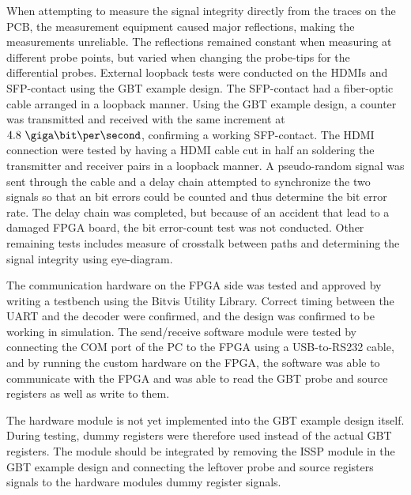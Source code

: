 \documentclass[main.tex]{subfiles}
\begin{document}
When attempting to measure the signal integrity directly from the traces on the PCB, the measurement equipment caused major reflections, making the measurements unreliable. The reflections remained constant when measuring at different probe points, but varied when changing the probe-tips for the differential probes. External loopback tests were conducted on the HDMIs and SFP-contact using the GBT example design. The SFP-contact had a fiber-optic cable arranged in a loopback manner. Using the GBT example design, a counter was transmitted and received with the same increment at $4.8~\giga\bit\per\second$, confirming a working SFP-contact. The HDMI connection were tested by having a HDMI cable cut in half an soldering the transmitter and receiver pairs in a loopback manner. A pseudo-random signal was sent through the cable and a delay chain attempted to synchronize the two signals so that an bit errors could be counted and thus determine the bit error rate. The delay chain was completed, but because of an accident that lead to a damaged FPGA board, the bit error-count test was not conducted. Other remaining tests includes measure of crosstalk between paths and determining the signal integrity using eye-diagram. 

The communication hardware on the FPGA side was tested and approved by writing a testbench using the Bitvis Utility Library. Correct timing between the UART and the decoder were confirmed, and the design was confirmed to be working in simulation. The send/receive software module were tested by connecting the COM port of the PC to the FPGA using a USB-to-RS232 cable, and by running the custom hardware on the FPGA, the software was able to communicate with the FPGA and was able to read the GBT probe and source registers as well as write to them. 

The hardware module is not yet implemented into the GBT example design itself. During testing, dummy registers were therefore used instead of the actual GBT registers. The module should be integrated by removing the ISSP module in the GBT example design and connecting the leftover probe and source registers signals to the hardware modules dummy register signals.
\end{document}
